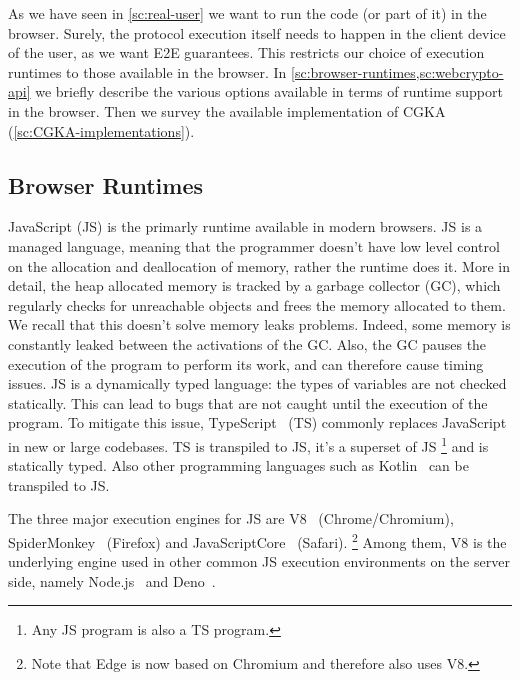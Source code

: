 As we have seen in \cref{sc:real-user} we want to
run the code (or part of it) in the browser.
Surely, the protocol execution itself needs to happen
in the client device of the user, as we want E2E guarantees.
This restricts our choice of execution runtimes to
those available in the browser. In \cref{sc:browser-runtimes,sc:webcrypto-api}
we briefly describe the various options available in terms of runtime
support in the browser.
Then we survey the available implementation of CGKA (\cref{sc:CGKA-implementations}).


\subsection{Browser Runtimes}\label{sc:browser-runtimes}

JavaScript (JS) is the primarly runtime available in modern browsers.
JS is a managed language, meaning that the programmer
doesn't have low level control on the allocation and
deallocation of memory, rather the runtime does it.
More in detail, the heap allocated memory
is tracked by a garbage collector (GC), which regularly
checks for unreachable objects and frees the memory allocated
to them. We recall that this doesn't solve memory leaks
problems. Indeed, some memory is constantly leaked
between the activations of the GC. Also, the GC
pauses the execution of the program to perform its work,
and can therefore cause timing issues. JS is a dynamically
typed language: the types of variables are not checked
statically. This can lead to bugs that are not caught
until the execution of the program.
To mitigate this issue, TypeScript~\cite{bierman2014understanding} (TS)
commonly replaces JavaScript in new or large codebases.
TS is transpiled to JS, it's a superset of JS
\footnote{Any JS program is also a TS program.}
and is statically typed.
Also other programming languages such as
Kotlin~\cite{KotlinToJs} can be transpiled to JS.

The three major execution engines for JS are V8~\cite{V8} (Chrome/Chromium),
SpiderMonkey~\cite{SpiderMonkey} (Firefox) and JavaScriptCore~\cite{JavaScriptCore} (Safari).
\footnote{Note that Edge is now based on Chromium and therefore
also uses V8.}
Among them, V8 is the underlying engine used in other
common JS execution environments on the server side, 
namely Node.js~\cite{NodeJS} and Deno~\cite{Deno}.


